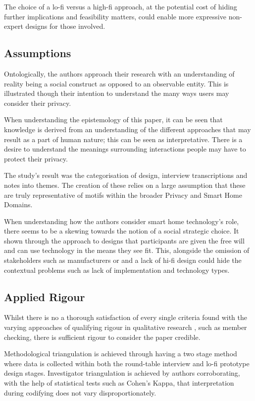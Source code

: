 The choice of a lo-fi versus a high-fi approach, at the potential cost of hiding further implications and feasibility matters, could enable more expressive non-expert designs for those involved.

\subsection{Assumptions}

Ontologically, the authors approach their research with an understanding of reality being a social construct as opposed to an observable entity. This is illustrated though their intention to understand the many ways users may consider their privacy.

When understanding the epistemology of this paper, it can be seen that knowledge is derived from an understanding of the different approaches that may result as a part of human nature; this can be seen as interpretative. There is a desire to understand the meanings surrounding interactions people may have to protect their privacy. 

The study's result was the categorisation of design, interview transcriptions and notes into themes. The creation of these relies on a large assumption that these are truly representative of motifs within the broader Privacy and Smart Home Domains. 

When understanding how the authors consider smart home technology's role, there seems to be a skewing towards the notion of a social strategic choice. It shown through the approach to designs that participants are given the free will and can use technology in the means they see fit. This, alongside the omission of stakeholders such as manufacturers or and a lack of hi-fi design could hide the contextual problems such as lack of implementation and technology types. 

\subsection{Applied Rigour}

Whilst there is no a thorough satisfaction of every single criteria found with the varying approaches of qualifying rigour in qualitative research \parencite{lincolnGuba1985}, such as member checking, there is sufficient rigour to consider the paper credible.

Methodological triangulation is achieved through having a two stage method where data is collected within both the round-table interview and lo-fi prototype design stages. Investigator triangulation is achieved by authors corroborating, with the help of statistical tests such as Cohen's Kappa, that interpretation during codifying does not vary disproportionately. 

